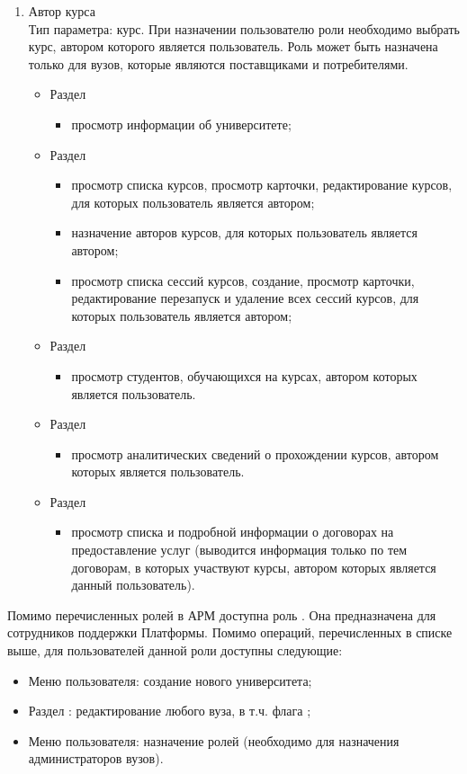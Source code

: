 \begin{enumerate}
	\item Автор курса\\
	Тип параметра: курс. При назначении пользователю роли необходимо выбрать курс, автором которого является пользователь. Роль может быть назначена только для вузов, которые являются поставщиками и потребителями.
	\begin{itemize}
		\item Раздел 
		\begin{itemize}
			\item просмотр информации об университете;
		\end{itemize}			
		\item Раздел 
		\begin{itemize}
			\item просмотр списка курсов, просмотр карточки, редактирование курсов, для которых пользователь является автором;
			\item назначение авторов курсов, для которых пользователь является автором;
			\item просмотр списка сессий курсов, создание, просмотр карточки, редактирование перезапуск и удаление всех сессий курсов, для которых пользователь является автором;
		\end{itemize}
		\item Раздел 
		\begin{itemize}
			\item просмотр студентов, обучающихся на курсах, автором которых является пользователь.
		\end{itemize}
		\item Раздел 
		\begin{itemize}
			\item просмотр аналитических сведений о прохождении курсов, автором которых является пользователь.
		\end{itemize}
		\item Раздел 
		\begin{itemize}
			\item просмотр списка и подробной информации о договорах на предоставление услуг (выводится информация только по тем договорам, в которых участвуют курсы, автором которых является данный пользователь).
		\end{itemize}					
	\end{itemize}

\end{enumerate}

Помимо перечисленных ролей в АРМ доступна роль . Она предназначена для сотрудников поддержки Платформы. Помимо операций, перечисленных в списке выше, для пользователей данной роли доступны следующие:

\begin{itemize}
	\item Меню пользователя: создание нового университета;
	\item Раздел : редактирование любого вуза, в т.ч. флага ;
	\item Меню пользователя: назначение ролей (необходимо для назначения администраторов вузов).
\end{itemize}
